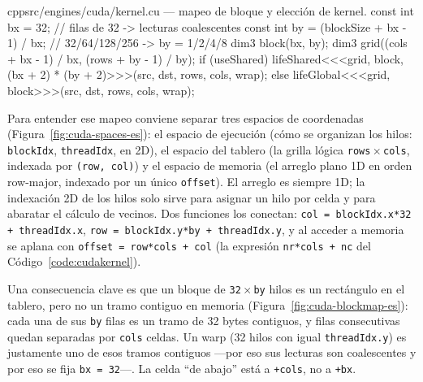 \documentclass[
	spanish,
	letterpaper, oneside
]{article}
\begin{document}
\begin{sourcecode}{cpp}{src/engines/cuda/kernel.cu --- mapeo de bloque y elección de kernel.}
const int bx = 32;                          // filas de 32 -> lecturas coalescentes
const int by = (blockSize + bx - 1) / bx;   // 32/64/128/256 -> by = 1/2/4/8
dim3 block(bx, by);
dim3 grid((cols + bx - 1) / bx, (rows + by - 1) / by);
if (useShared)
  lifeShared<<<grid, block, (bx + 2) * (by + 2)>>>(src, dst, rows, cols, wrap);
else
  lifeGlobal<<<grid, block>>>(src, dst, rows, cols, wrap);
\end{sourcecode}

Para entender ese mapeo conviene separar tres espacios de coordenadas
(Figura~\ref{fig:cuda-spaces-es}): el espacio de ejecución (cómo se
organizan los hilos: \texttt{blockIdx}, \texttt{threadIdx}, en 2D), el
espacio del tablero (la grilla lógica
\texttt{rows}\,$\times$\,\texttt{cols}, indexada por \texttt{(row, col)}) y el
espacio de memoria (el arreglo plano 1D en orden row-major,
indexado por un único \texttt{offset}). El arreglo es siempre 1D; la indexación
2D de los hilos solo sirve para asignar un hilo por celda y para abaratar el
cálculo de vecinos. Dos funciones los conectan:
\texttt{col = blockIdx.x*32 + threadIdx.x},
\texttt{row = blockIdx.y*by + threadIdx.y}, y al acceder a memoria se aplana con
\texttt{offset = row*cols + col} (la expresión \texttt{nr*cols + nc} del
Código~\ref{code:cudakernel}).


Una consecuencia clave es que un bloque de \texttt{32}\,$\times$\,\texttt{by}
hilos es un rectángulo en el tablero, pero no un tramo contiguo
en memoria (Figura~\ref{fig:cuda-blockmap-es}): cada una de sus \texttt{by} filas
es un tramo de 32 bytes contiguos, y filas consecutivas quedan separadas por
\texttt{cols} celdas. Un warp (32 hilos con igual \texttt{threadIdx.y}) es
justamente uno de esos tramos contiguos ---por eso sus lecturas son coalescentes
y por eso se fija \texttt{bx = 32}---. La celda ``de abajo'' está a
\texttt{+cols}, no a \texttt{+bx}.

\end{document}
